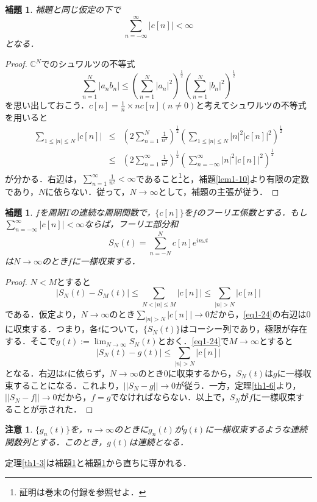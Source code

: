 \documentclass[a4j]{jsbook}
\newtheorem{lemma}[theorem]{補題}
\newtheorem{rem}[theorem]{注意}
\numberwithin{theorem}{chapter}  %
\begin{document}
\begin{lemma}
\label{lem1-11}
補題\upshape{\ref{lem1-10}}と同じ仮定の下で
\begin{equation*}
    \sum_{n=-\infty}^\infty |c[n]|<\infty
\end{equation*}
となる．
\end{lemma}
\begin{proof}
\(\mathbb{C}^N\)でのシュワルツの不等式
\begin{equation*}
    \sum_{n=1}^N |a_nb_n|\leq\left(\sum_{n=1}^N |a_n|^2\right)^\frac{1}{2}\left(\sum_{n=1}^N |b_n|^2\right)^\frac{1}{2}
\end{equation*}
を思い出しておこう．\(\displaystyle c[n]=\frac{1}{n}\times nc[n](n\neq 0)\)と考えてシュワルツの不等式を用いると
\begin{eqnarray*}
\sum_{1\leq|n|\leq N}|c[n]|&\leq&\left(2\sum_{n=1}^N\frac{1}{n^2}\right)^{\frac{1}{2}}\left(\sum_{1\leq|n|\leq N}|n|^2|c[n]|^2\right)^{\frac{1}{2}} \\
&\leq&\left(2\sum_{n=1}^\infty\frac{1}{n^2}\right)^{\frac{1}{2}}\left(\sum_{n=-\infty}^\infty|n|^2|c[n]|^2\right)^{\frac{1}{2}}
\end{eqnarray*}
が分かる．右辺は，\(\displaystyle \sum_{n=1}^\infty\frac{1}{n^2}<\infty\)であること\footnote{証明は巻末の付録を参照せよ．}と，補題\ref{lem1-10}より有限の定数であり，\(N\)に依らない．従って，\(N\to\infty\)として，補題の主張が従う．
\end{proof}
\begin{lemma}
\label{lem1-12}
\(f\)を周期\(T\)の連続な周期関数で，\(\{c[n]\}\)を\(f\)のフーリエ係数とする．もし\(\displaystyle \sum_{n=-\infty}^\infty |c[n]|<\infty\)ならば，フーリエ部分和
\begin{equation*}
    S_N(t)=\sum_{n=-N}^N c[n]e^{in\omega t}
\end{equation*}
は\(N\to\infty\)のとき\(f\)に一様収束する．
\end{lemma}
\begin{proof}
\(N<M\)とすると
\begin{equation}
    |S_N(t)-S_M(t)|\leq\sum_{N<|n|\leq M}|c[n]|\leq\sum_{|n|>N}|c[n]| \label{eq1-24}
\end{equation}
である．仮定より，\(N\to\infty\)のとき\(\displaystyle \sum_{|n|>N}|c[n]|\to 0\)だから，\eqref{eq1-24}の右辺は0に収束する．つまり，各\(t\)について，\(\{S_N(t)\}\)はコーシー列であり，極限が存在する．そこで\(\displaystyle g(t):=\lim_{N\to\infty} S_N(t)\)とおく．\eqref{eq1-24}で\(M\to\infty\)とすると
\begin{equation*}
    |S_N(t)-g(t)|\leq\sum_{|n|>N}|c[n]|
\end{equation*}
となる．右辺は\(t\)に依らず，\(N\to\infty\)のとき0に収束するから，\(S_N(t)\)は\(g\)に一様収束することになる．これより，\(||S_N-g||\to 0\)が従う．一方，定理\ref{th1-6}より，\(||S_N-f||\to 0\)だから，\(f=g\)でなければならない．以上で，\(S_N\)が\(f\)に一様収束することが示された．
\end{proof}
\begin{rem}
\label{rem1-2}
\(\{g_n(t)\}\)を，\(n\to\infty\)のときに\(g_n(t)\)が\(g(t)\)に一様収束するような連続関数列とする．このとき，\(g(t)\)は連続となる．
\end{rem}
定理\ref{th1-3}は補題\ref{lem1-11}と補題\ref{lem1-12}から直ちに導かれる．
\end{document}
